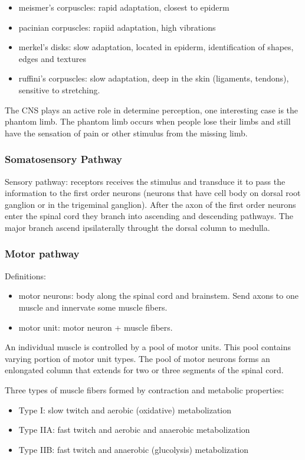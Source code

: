 \documentclass[12pt,article,oneside,a4paper]{memoir}
\begin{document}
\begin{itemize}
\item meismer's corpuscles: rapid adaptation, closest to epiderm
\item pacinian corpuscles: rapiid adaptation, high vibrations
\item merkel's disks: slow adaptation, located in epiderm, identification of shapes, edges and textures
\item ruffini's corpuscles: slow adaptation, deep in the skin (ligaments, tendons), sensitive to stretching.
\end{itemize}

The CNS plays an active role in determine perception, one interesting case is the phantom limb. The phantom limb occurs when people lose their limbs and still have the sensation of pain or other stimulus from the missing limb.

\subsubsection{Somatosensory Pathway}
Sensory pathway:
receptors receives the stimulus and transduce it to pass the information to the first order neurons (neurons that have cell body on dorsal root ganglion or in the trigeminal ganglion). After the axon of the first order neurons enter the spinal cord they branch into ascending and descending pathways. The major branch ascend ipsilaterally throught the dorsal column to medulla.


\subsubsection{Motor pathway}
Definitions:
\begin{itemize}
\item motor neurons: body along the spinal cord and brainstem. Send axons to one muscle and innervate some muscle fibers.
\item motor unit: motor neuron + muscle fibers.
\end{itemize}

An individual muscle is controlled by a pool of motor units. This pool contains varying portion of motor unit types. The pool of motor neurons forms an enlongated column that extends for two or three segments of the spinal cord.

Three types of muscle fibers formed by contraction and metabolic properties:
\begin{itemize}
\item Type I: slow twitch and aerobic (oxidative) metabolization
\item Type IIA: fast twitch and aerobic and anaerobic metabolization
\item Type IIB: fast twitch and anaerobic (glucolysis) metabolization
\end{itemize}
\end{document}
